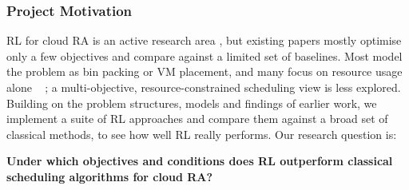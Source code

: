 \documentclass[12pt]{article}
\providecommand{\DIFaddtex}[1]{{\color{red}#1}} %
\providecommand{\DIFdeltex}[1]{} %
\providecommand{\DIFaddbegin}{} %
\providecommand{\DIFaddend}{} %
\providecommand{\DIFdelbegin}{} %
\providecommand{\DIFdelend}{} %
\providecommand{\DIFadd}[1]{\texorpdfstring{\DIFaddtex{#1}}{#1}} %
\providecommand{\DIFdel}[1]{\texorpdfstring{\DIFdeltex{#1}}{}} %
\providecommand{\DIFscaledelfig}{0.5}
\newlength{\DIFdelgraphicswidth} %
\newlength{\DIFdelgraphicsheight} %
\providecommand{\DIFaddincludegraphics}[2][]{{\color{blue}\fbox{\DIFOincludegraphics[#1]{#2}}}} %
\providecommand{\DIFdelincludegraphics}[2][]{%
\sbox{\DIFdelgraphicsbox}{\DIFOincludegraphics[#1]{#2}}%
\settoboxwidth{\DIFdelgraphicswidth}{\DIFdelgraphicsbox} %
\settoboxtotalheight{\DIFdelgraphicsheight}{\DIFdelgraphicsbox} %
\scalebox{\DIFscaledelfig}{%
\parbox[b]{\DIFdelgraphicswidth}{\usebox{\DIFdelgraphicsbox}\\[-\baselineskip] \rule{\DIFdelgraphicswidth}{0em}}\llap{\resizebox{\DIFdelgraphicswidth}{\DIFdelgraphicsheight}{%
\setlength{\unitlength}{\DIFdelgraphicswidth}%
\begin{picture}(1,1)%
\thicklines\linethickness{2pt} %
{\color[rgb]{1,0,0}\put(0,0){\framebox(1,1){}}}%
{\color[rgb]{1,0,0}\put(0,0){\line( 1,1){1}}}%
{\color[rgb]{1,0,0}\put(0,1){\line(1,-1){1}}}%
\end{picture}%
}\hspace*{3pt}}} %
} %
\DeclareRobustCommand{\DIFaddbegin}{\DIFOaddbegin \let\includegraphics\DIFaddincludegraphics} %
\DeclareRobustCommand{\DIFaddend}{\DIFOaddend \let\includegraphics\DIFOincludegraphics} %
\DeclareRobustCommand{\DIFdelbegin}{\DIFOdelbegin \let\includegraphics\DIFdelincludegraphics} %
\DeclareRobustCommand{\DIFdelend}{\DIFOaddend \let\includegraphics\DIFOincludegraphics} %
\begin{document}
\subsubsection{Project Motivation}
RL for cloud RA is \DIFdelbegin \DIFdel{in active research }\DIFdelend \DIFaddbegin \DIFadd{an active research area }\DIFaddend \cite{ml_ra_litrev2025, DAHMANI2025100616}, but existing papers \DIFdelbegin \DIFdel{mainly review }\DIFdelend \DIFaddbegin \DIFadd{mostly optimise }\DIFaddend only a few objectives \DIFdelbegin \DIFdel{for RL, }\DIFdelend and compare against a limited set of baselines. \DIFdelbegin \DIFdel{Exploring a more multi-objective approach or modelling as a resource constrained optimisation (RCO) problem isn't as expressed in industry. Most papers use a bin-packing }\DIFdelend \DIFaddbegin \DIFadd{Most model the problem as bin packing }\DIFaddend or VM placement\DIFdelbegin \DIFdel{approach, many explore improving resource usage of RL \mbox{%
\cite{cloud_rco}}\hskip0pt%
, and so a more comprehensive review of RL in cloud RA is necessary. Through existing papers' research on problem decisions, structure, models , new algorithms or findings for using RL, we can }\DIFdelend \DIFaddbegin \DIFadd{, and many focus on resource usage alone \mbox{%
\cite{cloud_rco}}\hskip0pt%
; a multi-objective, resource-constrained scheduling view is less explored. Building on the problem structures, models and findings of earlier work, we }\DIFaddend implement a suite of \DIFdelbegin \DIFdel{approaches to truly }\DIFdelend \DIFaddbegin \DIFadd{RL approaches and compare them against a broad set of classical methods, to }\DIFaddend see how well RL \DIFdelbegin \DIFdel{performs based on the research before us. }%
\DIFdel{We would like to see }\DIFdelend \DIFaddbegin \DIFadd{really performs. Our research question is:
}\begin{center}
\DIFaddend \textbf{\DIFdelbegin \DIFdel{under }\DIFdelend \DIFaddbegin \DIFadd{Under }\DIFaddend which objectives and conditions does RL outperform classical scheduling algorithms \DIFdelbegin \DIFdel{on the problem of }\DIFdelend \DIFaddbegin \DIFadd{for }\DIFaddend cloud RA?}
\DIFaddbegin \end{center}

\DIFaddend 
\end{document}
